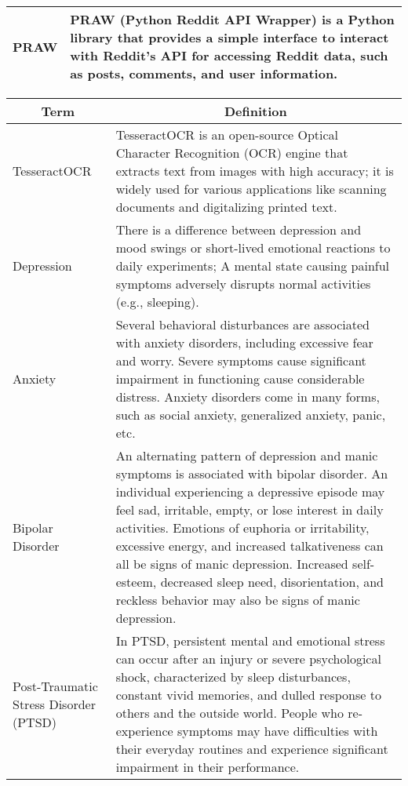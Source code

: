 \begin{center}
\begin{tabular}{|p{4cm}|p{10cm}|}
  \hline
  PRAW & PRAW (Python Reddit API Wrapper) is a Python library that provides a simple interface to interact with Reddit's API for accessing Reddit data, such as posts, comments, and user information. \\
  \hline
\end{tabular}

\begin{tabular}{|p{4cm}|p{10cm}|}
    \hline
    \multicolumn{1}{|c|}{\textbf{Term}} & \multicolumn{1}{c|}{\textbf{Definition}} \\
  

  \hline
  TesseractOCR & TesseractOCR is an open-source Optical Character Recognition (OCR) engine that extracts text from images with high accuracy; it is widely used for various applications like scanning documents and digitalizing printed text. \\

  \hline
  Depression & There is a difference between depression and mood swings or short-lived emotional reactions to daily experiments; A mental state causing painful symptoms adversely disrupts normal activities (e.g., sleeping). \\

  \hline
  Anxiety & Several behavioral disturbances are associated with anxiety disorders, including excessive fear and worry. Severe symptoms cause significant impairment in functioning cause considerable distress. Anxiety disorders come in many forms, such as social anxiety, generalized anxiety, panic, etc. \\

  \hline
  Bipolar Disorder & An alternating pattern of depression and manic symptoms is associated with bipolar disorder. An individual experiencing a depressive episode may feel sad, irritable, empty, or lose interest in daily activities. Emotions of euphoria or irritability, excessive energy, and increased talkativeness can all be signs of manic depression. Increased self-esteem, decreased sleep need, disorientation, and reckless behavior may also be signs of manic depression. \\

  \hline
  Post-Traumatic Stress Disorder (PTSD) & In PTSD, persistent mental and emotional stress can occur after an injury or severe psychological shock, characterized by sleep disturbances, constant vivid memories, and dulled response to others and the outside world. People who re-experience symptoms may have difficulties with their everyday routines and experience significant impairment in their performance. \\


\end{tabular}
\end{center}
